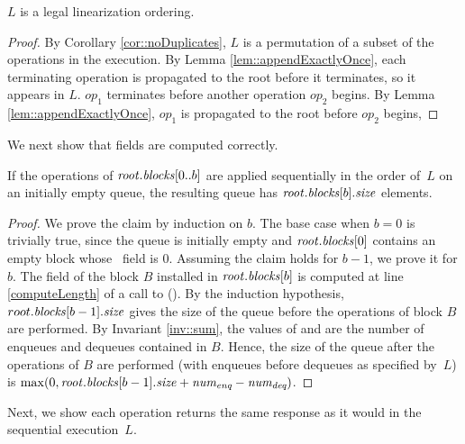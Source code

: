\begin{lemma} \label{linearSat}
$L$ is a legal linearization ordering.
\end{lemma}
\begin{proof}
By Corollary \ref{cor::noDuplicates}, $L$ is a permutation of a subset of the operations in the execution.
By Lemma \ref{lem::appendExactlyOnce}, each terminating operation is propagated to the root before it terminates,
so it appears in $L$.
 $op_{1}$ terminates before another operation $op_{2}$ begins. By Lemma \ref{lem::appendExactlyOnce}, $op_{1}$ 
is propagated to the root before $op_2$ begins, 
\end{proof}

We next show that  fields are computed correctly.
\begin{lemma}
\label{sizeCorrectness}
If the operations of $\mbox{\textnormal{\textit{root}}}.\mbox{\textit{blocks}}[0..b]$ are applied sequentially in the order of~$L$ on an initially empty queue, the resulting queue has $\mbox{\textnormal{\textit{root}}}.\mbox{\textit{blocks}}[b].\mbox{\textit{size}}$ elements.  
\end{lemma}

\begin{proof}
We prove the claim by induction on $b$. 
The base case when ${b=0}$ is trivially true, since the queue is initially empty and 
$\mbox{\textnormal{\textit{root}}}.\mbox{\textit{blocks}}[0]$ contains an empty block whose \size\ field is $0$. 
Assuming the claim holds for $b-1$, we prove it for $b$.
The  field of the block $B$ installed in $\mbox{\textnormal{\textit{root}}}.\mbox{\textit{blocks}}[b]$ is computed
at line \ref{computeLength} of a call to ().
By the induction hypothesis, $root.\mbox{\textit{blocks}}[b-1].\mbox{\textit{size}}$ gives the size of the queue before the operations
of block $B$ are performed.
By Invariant \ref{inv::sum}, the values of  and 
are the number of enqueues and dequeues contained in $B$.
Hence, the size of the queue after the operations of $B$ are performed (with enqueues before dequeues as specified by~$L$)
is $\max(0, \mbox{\textnormal{\textit{root}}}.\mbox{\textit{blocks}}[b-1].\mbox{\textit{size}} + \mbox{\textnormal{\textit{num\textsubscript{enq}}}} - \mbox{\textnormal{\textit{num\textsubscript{deq}}}})$.
\end{proof}

Next, we show each operation returns the same response as it would in the sequential execution~$L$.

